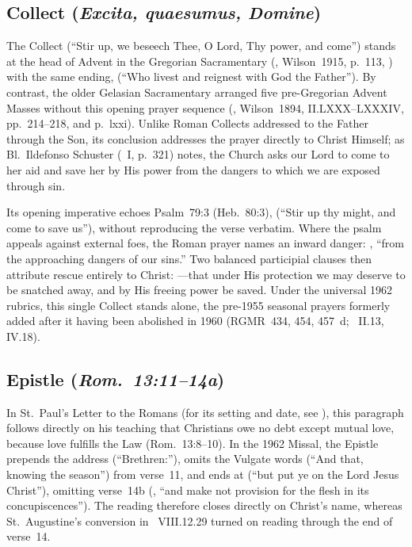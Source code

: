 \subsection{Collect (\textit{Excita, quaesumus, Domine})}

The Collect  (``Stir up, we beseech Thee, O Lord, Thy power, and come'') stands at the head of Advent in the Gregorian Sacramentary (, Wilson~1915, p.~113, ) with the same ending,  (``Who livest and reignest with God the Father''). By contrast, the older Gelasian Sacramentary arranged five pre-Gregorian Advent Masses without this opening prayer sequence (, Wilson~1894, II.LXXX--LXXXIV, pp.~214--218, and p.~lxxi). Unlike Roman Collects addressed to the Father through the Son, its  conclusion addresses the prayer directly to Christ Himself; as Bl.~Ildefonso Schuster (~I, p.~321) notes, the Church asks our Lord to come to her aid and save her by His power from the dangers to which we are exposed through sin.

Its opening imperative echoes Psalm~79:3 (Heb.~80:3),  (``Stir up thy might, and come to save us''), without reproducing the verse verbatim. Where the psalm appeals against external foes, the Roman prayer names an inward danger: , ``from the approaching dangers of our sins.'' Two balanced participial clauses then attribute rescue entirely to Christ: ---that under His protection we may deserve to be snatched away, and by His freeing power be saved. Under the universal 1962 rubrics, this single Collect stands alone, the pre-1955 seasonal prayers formerly added after it having been abolished in 1960 (RGMR~434, 454, 457~d; ~II.13, IV.18).

\subsection{Epistle (\textit{Rom.~13:11--14a})}

In St.~Paul's Letter to the Romans (for its setting and date, see \hyperref[sec:date-location]{}), this paragraph follows directly on his teaching that Christians owe no debt except mutual love, because love fulfills the Law (Rom.~13:8--10). In the 1962 Missal, the Epistle prepends the address  (``Brethren:''), omits the Vulgate words  (``And that, knowing the season'') from verse~11, and ends at  (``but put ye on the Lord Jesus Christ''), omitting verse~14b (, ``and make not provision for the flesh in its concupiscences''). The reading therefore closes directly on Christ's name, whereas St.~Augustine's conversion in ~VIII.12.29 turned on reading through the end of verse~14.

